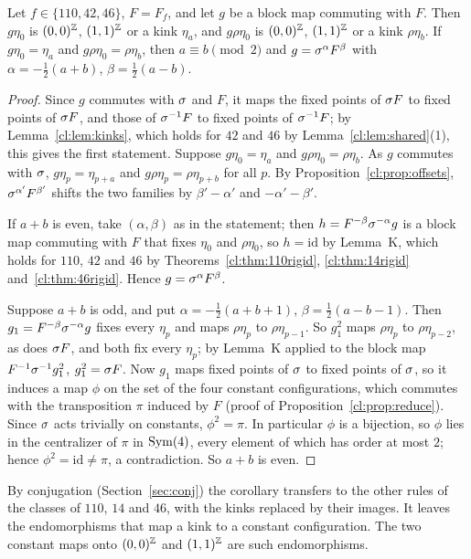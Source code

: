 \begin{corollary}\label{cor:End}
Let $f\in\{110,42,46\}$, $F=F_f$, and let $g$ be a block map commuting with $F$. Then $g\eta_0$ is $(0,0)^{\mathbb{Z}}$, $(1,1)^{\mathbb{Z}}$ or a kink $\eta_a$, and $g\rho\eta_0$ is $(0,0)^{\mathbb{Z}}$, $(1,1)^{\mathbb{Z}}$ or a kink $\rho\eta_b$. If $g\eta_0=\eta_a$ and $g\rho\eta_0=\rho\eta_b$, then $a\equiv b\pmod 2$ and $g=\sigma^{\alpha}F^{\beta}$ with $\alpha=-\frac12(a+b)$, $\beta=\frac12(a-b)$.
\end{corollary}

\begin{proof}
Since $g$ commutes with $\sigma$ and $F$, it maps the fixed points of $\sigma F$ to fixed points of $\sigma F$, and those of $\sigma^{-1}F$ to fixed points of $\sigma^{-1}F$; by Lemma~\ref{cl:lem:kinks}, which holds for $42$ and $46$ by Lemma~\ref{cl:lem:shared}(1), this gives the first statement. Suppose $g\eta_0=\eta_a$ and $g\rho\eta_0=\rho\eta_b$. As $g$ commutes with $\sigma$, $g\eta_p=\eta_{p+a}$ and $g\rho\eta_p=\rho\eta_{p+b}$ for all $p$. By Proposition~\ref{cl:prop:offsets}, $\sigma^{\alpha'}F^{\beta'}$ shifts the two families by $\beta'-\alpha'$ and $-\alpha'-\beta'$.

If $a+b$ is even, take $(\alpha,\beta)$ as in the statement; then $h=F^{-\beta}\sigma^{-\alpha}g$ is a block map commuting with $F$ that fixes $\eta_0$ and $\rho\eta_0$, so $h=\mathrm{id}$ by Lemma~K, which holds for $110$, $42$ and $46$ by Theorems~\ref{cl:thm:110rigid}, \ref{cl:thm:14rigid} and~\ref{cl:thm:46rigid}. Hence $g=\sigma^\alpha F^\beta$.

Suppose $a+b$ is odd, and put $\alpha=-\frac12(a+b+1)$, $\beta=\frac12(a-b-1)$. Then $g_1=F^{-\beta}\sigma^{-\alpha}g$ fixes every $\eta_p$ and maps $\rho\eta_p$ to $\rho\eta_{p-1}$. So $g_1^2$ maps $\rho\eta_p$ to $\rho\eta_{p-2}$, as does $\sigma F$, and both fix every $\eta_p$; by Lemma~K applied to the block map $F^{-1}\sigma^{-1}g_1^2$, $g_1^2=\sigma F$. Now $g_1$ maps fixed points of $\sigma$ to fixed points of $\sigma$, so it induces a map $\phi$ on the set of the four constant configurations, which commutes with the transposition $\pi$ induced by $F$ (proof of Proposition~\ref{cl:prop:reduce}). Since $\sigma$ acts trivially on constants, $\phi^2=\pi$. In particular $\phi$ is a bijection, so $\phi$ lies in the centralizer of $\pi$ in $\operatorname{Sym}(4)$, every element of which has order at most $2$; hence $\phi^2=\mathrm{id}\ne\pi$, a contradiction. So $a+b$ is even.
\end{proof}

By conjugation (Section~\ref{sec:conj}) the corollary transfers to the other rules of the classes of $110$, $14$ and $46$, with the kinks replaced by their images. It leaves the endomorphisms that map a kink to a constant configuration. The two constant maps onto $(0,0)^{\mathbb{Z}}$ and $(1,1)^{\mathbb{Z}}$ are such endomorphisms.

